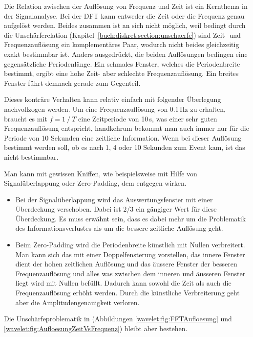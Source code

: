 Die Relation zwischen der Auflösung von Frequenz und Zeit ist ein
Kernthema in der Signalanalyse.
Bei der DFT kann entweder die Zeit oder die Frequenz genau aufgelöst
werden.
Beides zusammen ist an sich nicht möglich, weil bedingt durch die
Unschärferelation (Kapitel~\ref{buch:diskret:section:unschaerfe})
%
sind Zeit- und Frequenzauflösung ein komplementäres Paar, wodurch
nicht beides gleichzeitig exakt bestimmbar ist.
Anders ausgedrückt, die beiden Auflösungen bedingen
eine gegensätzliche Periodenlänge.
Ein schmales Fenster, welches die Periodenbreite bestimmt, ergibt
eine hohe Zeit- aber schlechte Frequenzauflösung.
Ein breites Fenster führt demnach gerade zum Gegenteil.

Dieses konträre Verhalten kann relativ einfach mit folgender
Überlegung nachvollzogen werden.
Um eine Frequenzauflösung von 0.1\,Hz zu erhalten, braucht
es mit $f=1⁄T$ eine Zeitperiode von 10\,s, was einer sehr guten
Frequenzauflösung entspricht, handkehrum bekommt man auch immer nur
für die Periode von 10 Sekunden eine zeitliche Information. Wenn
bei dieser Auflösung bestimmt werden soll, ob es nach 1, 4 oder 10
Sekunden zum Event kam, ist das nicht bestimmbar.
 
Man kann mit gewissen Kniffen, wie beispielsweise mit Hilfe von
Signalüberlappung oder Zero-Padding, dem entgegen wirken.
%
\begin{itemize}
	\item Bei der Signalüberlappung wird das Auswertungsfenster
	mit einer Überdeckung verschoben. Dabei ist $2/3$ ein
	gängiger Wert für diese Überdeckung. Es muss erwähnt sein,
	dass es dabei mehr um die Problematik des Informationsverlustes
	als um die bessere zeitliche Auflösung geht.
	\item Beim Zero-Padding wird die Periodenbreite künstlich
	mit Nullen verbreitert.
	Man kann sich das mit einer Doppelfensterung vorstellen,
	das innere Fenster dient der hohen zeitlichen Auflösung und
	das äussere Fenster der besseren Frequenzauflösung und alles
	was zwischen dem inneren und äusseren Fenster liegt wird
	mit Nullen befüllt.
	Dadurch kann sowohl die Zeit als auch die Frequenzauflösung erhöht
	werden.
	Durch die künstliche Verbreiterung geht aber die
	Amplitudengenauigkeit verloren.
\end{itemize}
Die Unschärfeproblematik in (Abbildungen \ref{wavelet:fig:FFTAufloesung}
und \ref{wavelet:fig:AufloesungZeitVsFrequenz}) bleibt aber bestehen.

